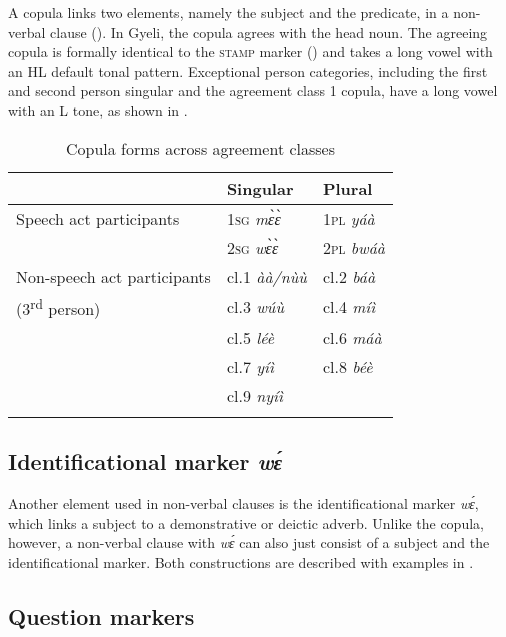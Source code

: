 A copula links two elements, namely the subject and the predicate, in a non-verbal clause (). In Gyeli, the copula agrees with the head noun. The agreeing copula is formally identical to the \textsc{stamp} marker () and takes a long vowel with an HL default tonal pattern. Exceptional person categories, including the first and second person singular and the agreement class 1 copula, have a long vowel with an L tone, as shown in .

\begin{table}
\begin{tabular}{lll}
 \lsptoprule
 & Singular & Plural \\
\midrule
Speech act participants & 1\textsc{sg} {\itshape mɛ̀ɛ̀} & 1\textsc{pl} {\itshape yáà} \\
 & 2\textsc{sg} {\itshape wɛ̀ɛ̀} & 2\textsc{pl} {\itshape bwáà} \\
 \tablevspace
Non-speech act participants & cl.1 {\itshape àà/nùù} & cl.2 {\itshape báà} \\
(3\textsuperscript{rd} person) & cl.3 {\itshape wúù} & cl.4  {\itshape míì} \\
& cl.5 {\itshape léè} & cl.6 {\itshape máà} \\
 & cl.7 {\itshape yíì} & cl.8 {\itshape béè} \\
&  cl.9 {\itshape nyíì} & \\
 \lspbottomrule
\end{tabular}
\caption{Copula forms across agreement classes}
\label{Tab:COPx}
\end{table}




\subsection{Identificational marker {\itshape wɛ́}}
\label{sec:IDwe}

Another element used in non-verbal clauses is the identificational marker {\itshape wɛ́}, which links a subject to a demonstrative or deictic adverb. Unlike the copula, however, a non-verbal clause with {\itshape wɛ́} can also just consist of a subject and the identificational marker. Both constructions are described with examples in .


\subsection{Question markers}
\label{sec:Qna}

